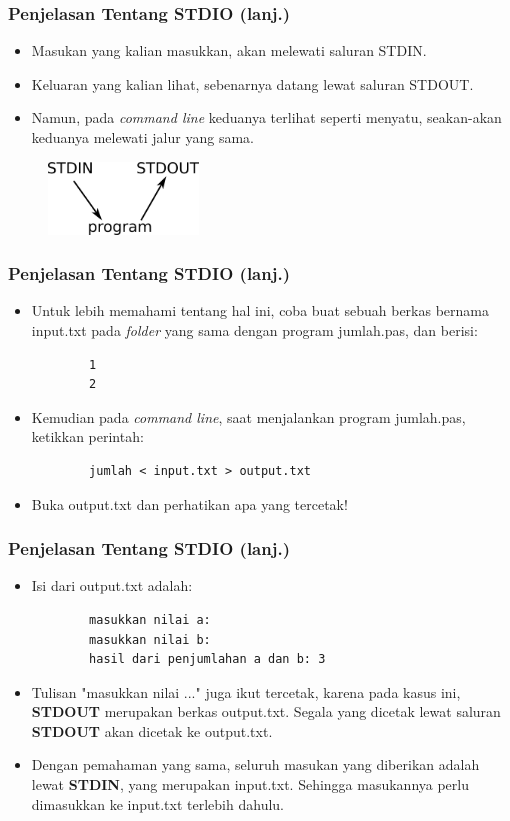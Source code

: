 \documentclass{beamer}
\begin{document}
\begin{frame}
\frametitle{Penjelasan Tentang STDIO (lanj.)}
\begin{itemize}
    \item Masukan yang kalian masukkan, akan melewati saluran STDIN.
    \item Keluaran yang kalian lihat, sebenarnya datang lewat saluran STDOUT.
    \item Namun, pada \textit{command line} keduanya terlihat seperti menyatu, seakan-akan keduanya melewati jalur yang sama.
\end{itemize}
\begin{figure}
    \includegraphics[width=4cm]{asset/g1.png}
\end{figure}
\end{frame}

\begin{frame}[fragile]
\frametitle{Penjelasan Tentang STDIO (lanj.)}
\begin{itemize}
    \item Untuk lebih memahami tentang hal ini, coba buat sebuah berkas bernama input.txt pada \textit{folder} yang sama dengan program jumlah.pas, dan berisi:
    \begin{lstlisting}
        1
        2
    \end{lstlisting}
    \item Kemudian pada \textit{command line}, saat menjalankan program jumlah.pas, ketikkan perintah:
    \begin{lstlisting}
        jumlah < input.txt > output.txt
    \end{lstlisting}
    \item Buka output.txt dan perhatikan apa yang tercetak!
\end{itemize}
\end{frame}

\begin{frame}[fragile]
\frametitle{Penjelasan Tentang STDIO (lanj.)}
\begin{itemize}
    \item Isi dari output.txt adalah:
    \begin{lstlisting}
        masukkan nilai a:
        masukkan nilai b:
        hasil dari penjumlahan a dan b: 3
    \end{lstlisting}
    \item Tulisan "masukkan nilai ..." juga ikut tercetak, karena pada kasus ini, \textbf{STDOUT} merupakan berkas output.txt. Segala yang dicetak lewat saluran \textbf{STDOUT} akan dicetak ke output.txt.
    \item Dengan pemahaman yang sama, seluruh masukan yang diberikan adalah lewat \textbf{STDIN}, yang merupakan input.txt. Sehingga masukannya perlu dimasukkan ke input.txt terlebih dahulu.
\end{itemize}
\end{frame}
\end{document}
